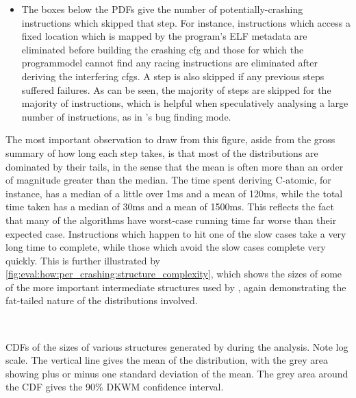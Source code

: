 \begin{itemize}
  across the figure.  In this case, nine instructions reached the five
  minute timeout during {\StateMachine} simplification, one reached
  the timeout while deriving the interfering \glspl{cfg}, and three
  instructions ran out of memory while deriving the interfering
  \glspl{cfg}.  Note that the timeout runs from the start of the
  ``build crashing \gls{cfg}'' step, rather than from the start of the
  current step.
\item The boxes below the PDFs give the number of potentially-crashing
  instructions which skipped that step.  For instance, instructions
  which access a fixed location which is mapped by the program's ELF
  metadata are eliminated before building the crashing \gls{cfg} and
  those for which the \gls{programmodel} cannot find any racing
  instructions are eliminated after deriving the interfering
  \glspl{cfg}.  A step is also skipped if any previous steps suffered
  failures.  As can be seen, the majority of steps are skipped for the
  majority of instructions, which is helpful when speculatively
  analysing a large number of instructions, as in {\technique}'s bug
  finding mode.
\end{itemize}
The most important observation to draw from this figure, aside from
the gross summary of how long each step takes, is that most of the
distributions are dominated by their tails, in the sense that the mean
is often more than an order of magnitude greater than the median.  The
time spent deriving C-atomic, for instance, has a median of a little
over 1ms and a mean of 120ms, while the total time taken has a median
of 30ms and a mean of 1500ms.  This reflects the fact that many of the
algorithms have worst-case running time far worse than their expected
case.  Instructions which happen to hit one of the slow cases take a
very long time to complete, while those which avoid the slow cases
complete very quickly.  This is further illustrated by
\autoref{fig:eval:how:per_crashing:structure_complexity}, which shows
the sizes of some of the more important intermediate structures used
by {\technique}, again demonstrating the fat-tailed nature of the
distributions involved.

\begin{sanefig}
  \\
  \caption{CDFs of the sizes of various structures generated by
    {\technique} during the analysis.  Note log scale.  The vertical
    line gives the mean of the distribution, with the grey area
    showing plus or minus one standard deviation of the mean.  The
    grey area around the CDF gives the 90\% DKWM confidence
    interval. \label{fig:eval:how:per_crashing:structure_complexity}}
\end{sanefig}

